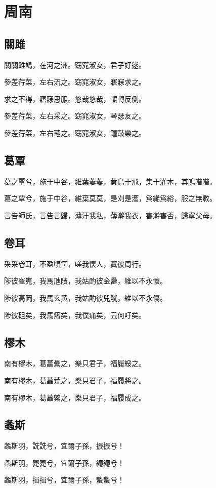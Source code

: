 \section[周南]{周南}

\subsection[關雎]{關雎}

關關雎鳩，在河之洲。窈窕淑女，君子好逑。

參差荇菜，左右流之。窈窕淑女，寤寐求之。

求之不得，寤寐思服。悠哉悠哉，輾轉反側。

參差荇菜，左右采之。窈窕淑女，琴瑟友之。

參差荇菜，左右芼之。窈窕淑女，鐘鼓樂之。

\subsection[葛覃]{葛覃}

葛之覃兮，施于中谷，維葉萋萋，黄鳥于飛，集于灌木，其鳴喈喈。

葛之覃兮，施于中谷，維葉莫莫，是刈是濩，爲絺爲綌，服之無斁。

言告師氏，言告言歸，薄汙我私，薄澣我衣，害澣害否，歸寧父母。

\subsection[卷耳]{卷耳}

采采卷耳，不盈頃筐，嗟我懷人，寘彼周行。

陟彼崔嵬，我馬虺隤，我姑酌彼金罍，維以不永懷。

陟彼高岡，我馬玄黄，我姑酌彼兕觥，維以不永傷。

陟彼砠矣，我馬瘏矣，我僕痡矣，云何吁矣。

\subsection[樛木]{樛木}

南有樛木，葛藟纍之，樂只君子，福履綏之。

南有樛木，葛藟荒之，樂只君子，福履將之。

南有樛木，葛藟縈之，樂只君子，福履成之。

\subsection[螽斯]{螽斯}

螽斯羽，詵詵兮，宜爾子孫，振振兮！

螽斯羽，薨薨兮，宜爾子孫，繩繩兮！

螽斯羽，揖揖兮，宜爾子孫，蟄蟄兮！
